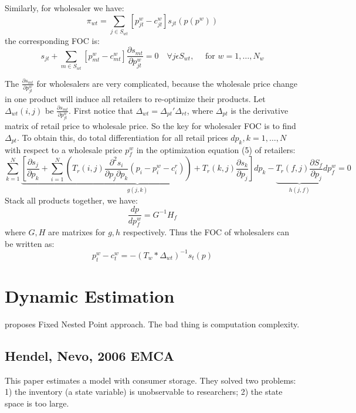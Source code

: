 Similarly, for wholesaler we have:
\[
    \pi_{w t}=\sum_{j \in S_{w t}}\left[p_{j t}^{w}-c_{j t}^{w}\right] s_{j t}\left(p\left(p^{w}\right)\right)
\]
the corresponding FOC is:
\[
    s_{j t}+\sum_{m \in S_{w t}}\left[p_{m t}^{w}-c_{m t}^{w}\right] \frac{\partial s_{m t}}{\partial p_{j t}^{w}}=0 \quad \forall j \epsilon S_{w t}, \quad \text { for } w=1, \ldots, N_{w}
\]

The $\frac{\partial s_{m t}}{\partial p_{j t}^{w}}$ for wholesalers are very complicated, because the wholesale price change in one product will induce all retailers to re-optimize their products.
Let $\Delta_{wt}(i,j)$ be $\frac{\partial s_{m t}}{\partial p_{j t}^{w}}$.
First notice that $\Delta_{wt} = \Delta_{pt}'\Delta_{rt}$, where $\Delta_{pt}$ is the derivative matrix of retail price to wholesale price. 
So the key for wholesaler FOC is to find $\Delta_{pt}$.
To obtain this, do total differentiation for all retail prices $dp_k,k=1,\ldots,N$ with respect to a wholesale price $p^w_f$ in the optimization equation (5) of retailers:
\[
    \sum_{k=1}^{N} \underbrace{\left[\frac{\partial s_{j}}{\partial p_{k}}+\sum_{i=1}^{N}\left(T_{r}(i, j) \frac{\partial^{2} s_{i}}{\partial p_{j} \partial p_{k}}\left(p_{i}-p_{i}^{w}-c_{i}^{r}\right)\right)+T_{r}(k, j) \frac{\partial s_{k}}{\partial p_{j}}\right]}_{g(j, k)} d p_{k} - 
    \underbrace{T_{r}(f, j) \frac{\partial S_{f}}{\partial p_{j}}}_{h(j, f)} d p_{f}^{w}=0
\]
Stack all products together, we have:
\[
    \frac{d p}{d p_{f}^{w}}=G^{-1} H_{f}
\]
where $G,H$ are matrixes for $g,h$ respectively.
Thus the FOC of wholesalers can be written as:
\[
    p_{t}^{w}-c_{t}^{w}=-\left(T_{w} * \Delta_{w t}\right)^{-1} s_{t}(p)
\]


\chapter{Dynamic Estimation}
\label{cha:dynamic_estimation}

\citet{Rust1987} proposes Fixed Nested Point approach.
The bad thing is computation complexity.

\section{Hendel, Nevo, 2006 EMCA} %
\label{sec:hendel_nevo_2006_emca}

\textbf{}

This paper estimates a model with consumer storage. 
They solved two problems: 
1) the inventory (a state variable) is unobservable to researchers;
2) the state space is too large.

